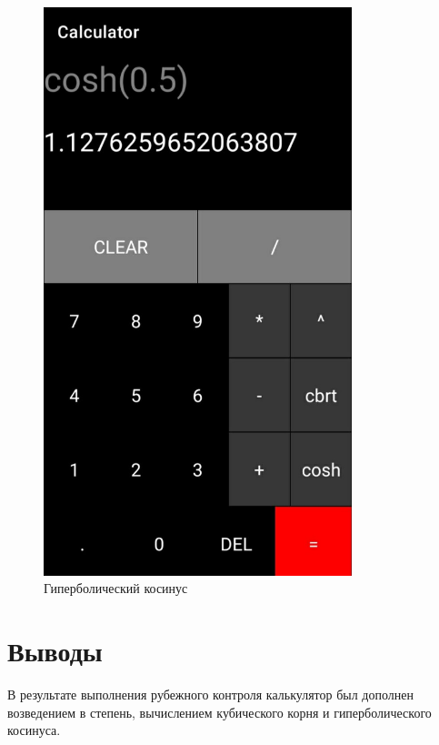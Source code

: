 \documentclass[a4paper, 14pt]{extarticle}
\begin{document}
\begin{figure}[!htb]
	\centering
	\includegraphics[width=0.8\textwidth]{img3}
\caption{Гиперболический косинус}
\label{fig:img3}
\end{figure}

\section{Выводы}\label{Sect::conclusion}

В результате выполнения рубежного контроля калькулятор был дополнен возведением в степень, вычислением кубического корня и гиперболического косинуса.
\end{document}
